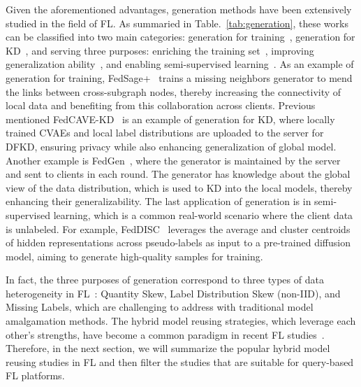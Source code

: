 Given the aforementioned advantages, generation methods have been extensively studied in the field of FL. 
As summaried in Table.~\ref{tab:generation}, these works can be classified into two main categories: generation for training~\cite{zhang2021subgraph, cheng2023gfl, hao2021towards, cha2019federated, yu2023turning, heinbaugh2023data, yang2023exploring, liu2021feddg, pi2022dynafed, liz2022federated, diao2022semifl}, generation for KD~\cite{zhang2022dense, chen2020fedbe, zhu2021data, zhang2022fine, jeong2018communication, jin2023feddyn, heinbaugh2023data, zhang2022fedzkt, fan2022private}, and serving three purposes: enriching the training set~\cite{zhang2022dense, chen2020fedbe, zhang2021subgraph, cheng2023gfl, cha2019federated, jin2023feddyn, zhang2022fedzkt}, improving generalization ability~\cite{zhu2021data, zhang2022fine, hao2021towards, jeong2018communication, yu2023turning, heinbaugh2023data, liu2021feddg, pi2022dynafed, liz2022federated}, and enabling semi-supervised learning~\cite{yang2023exploring, diao2022semifl, fan2022private}.
As an example of generation for training, FedSage+~\cite{zhang2021subgraph} trains a missing neighbors generator to mend the links between cross-subgraph nodes, thereby increasing the connectivity of local data and benefiting from this collaboration across clients.
Previous mentioned FedCAVE-KD~\cite{heinbaugh2023data} is an example of generation for KD, where locally trained CVAEs and local label distributions are uploaded to the server for DFKD, ensuring privacy while also enhancing generalization of global model.
Another example is FedGen~\cite{zhu2021data}, where the generator is maintained by the server and sent to clients in each round.
The generator has knowledge about the global view of the data distribution, which is used to KD into the local models, thereby enhancing their generalizability.
The last application of generation is in semi-supervised learning, which is a common real-world scenario where the client data is unlabeled.
For example, FedDISC~\cite{yang2023exploring} leverages the average and cluster centroids of hidden representations across pseudo-labels as input to a pre-trained diffusion model, aiming to generate high-quality samples for training.

In fact, the three purposes of generation correspond to three types of data heterogeneity in FL~\cite{liqb2022federated}: Quantity Skew, Label Distribution Skew (non-IID), and Missing Labels, which are challenging to address with traditional model amalgamation methods.
The hybrid model reusing strategies, which leverage each other's strengths, have become a common paradigm in recent FL studies~\cite{cheng2023gfl, xie2023perada, yu2023turning, jin2023feddyn, heinbaugh2023data, yang2023exploring, zhang2023federated}.
Therefore, in the next section, we will summarize the popular hybrid model reusing studies in FL and then filter the studies that are suitable for query-based FL platforms.

